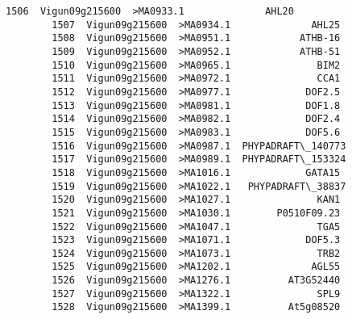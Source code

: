 \documentclass[11pt]{article}
\begin{document}
\begin{Verbatim}[commandchars=\\\{\}]
        1506  Vigun09g215600  >MA0933.1              AHL20   
        1507  Vigun09g215600  >MA0934.1              AHL25   
        1508  Vigun09g215600  >MA0951.1            ATHB-16   
        1509  Vigun09g215600  >MA0952.1            ATHB-51   
        1510  Vigun09g215600  >MA0965.1               BIM2   
        1511  Vigun09g215600  >MA0972.1               CCA1   
        1512  Vigun09g215600  >MA0977.1             DOF2.5   
        1513  Vigun09g215600  >MA0981.1             DOF1.8   
        1514  Vigun09g215600  >MA0982.1             DOF2.4   
        1515  Vigun09g215600  >MA0983.1             DOF5.6   
        1516  Vigun09g215600  >MA0987.1  PHYPADRAFT\_140773   
        1517  Vigun09g215600  >MA0989.1  PHYPADRAFT\_153324   
        1518  Vigun09g215600  >MA1016.1             GATA15   
        1519  Vigun09g215600  >MA1022.1   PHYPADRAFT\_38837   
        1520  Vigun09g215600  >MA1027.1               KAN1   
        1521  Vigun09g215600  >MA1030.1        P0510F09.23   
        1522  Vigun09g215600  >MA1047.1               TGA5   
        1523  Vigun09g215600  >MA1071.1             DOF5.3   
        1524  Vigun09g215600  >MA1073.1               TRB2   
        1525  Vigun09g215600  >MA1202.1              AGL55   
        1526  Vigun09g215600  >MA1276.1          AT3G52440   
        1527  Vigun09g215600  >MA1322.1               SPL9   
        1528  Vigun09g215600  >MA1399.1          At5g08520   
        

\end{Verbatim}
\end{document}
